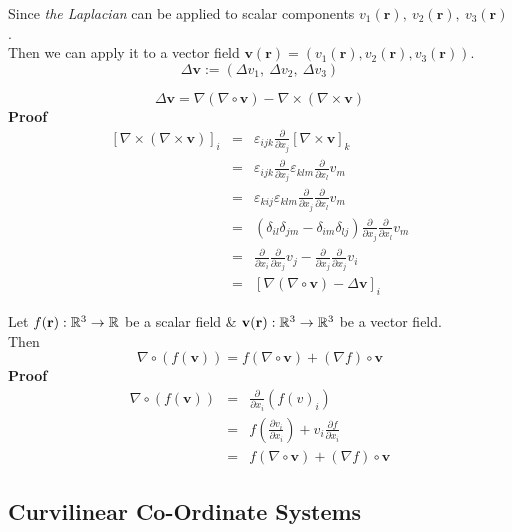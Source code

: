 \documentclass[11pt,a4paper]{article}
\begin{document}
Since \textit{the Laplacian} can be applied to scalar components $v_1(\textbf{r}),\ v_2(\textbf{r}),\ v_3(\textbf{r})$.\\
Then we can apply it to a vector field $\textbf{v}(\textbf{r})=\left(v_1(\textbf{r}), v_2(\textbf{r}), v_3(\textbf{r})\right)$.
$$\Delta\textbf{v}:=(\Delta v_1,\ \Delta v_2,\ \Delta v_3)$$

$$\Delta\textbf{v}=\nabla(\nabla\circ\textbf{v})-\nabla\times(\nabla\times\textbf{v})$$
\textbf{Proof}
\[\begin{array}{rcl}
[\nabla\times(\nabla\times\textbf{v})]_i&=&\varepsilon_{ijk}\frac{\partial}{\partial x_j}[\nabla\times\textbf{v}]_k\\
&=&\varepsilon_{ijk}\frac{\partial}{\partial x_j}\varepsilon_{klm}\frac{\partial}{\partial x_l}v_m\\
&=&\varepsilon_{kij}\varepsilon_{klm}\frac{\partial}{\partial x_j}\frac{\partial}{\partial x_l}v_m\\
&=&(\delta_{il}\delta_{jm}-\delta_{im}\delta_{lj})\frac{\partial}{\partial x_j}\frac{\partial}{\partial x_l}v_m\\
&=&\frac{\partial}{\partial x_i}\frac{\partial}{\partial x_j}v_j-\frac{\partial}{\partial x_j}\frac{\partial}{\partial x_j}v_i\\
&=&[\nabla(\nabla\circ\textbf{v})-\Delta\textbf{v}]_i
\end{array}\]

Let $f(\textbf{r}) : \mathbb{R}^3\to\mathbb{R}$ be a scalar field \& $\textbf{v}(\textbf{r}):\mathbb{R}^3\to\mathbb{R}^3$ be a vector field.\\
Then
$$\nabla\circ(f(\textbf{v}))=f(\nabla\circ\textbf{v})+(\nabla f)\circ\textbf{v}$$
\textbf{Proof}
\[\begin{array}{rcl}
\nabla\circ(f(\textbf{v}))&=&\frac{\partial}{\partial x_i}(f(v)_i)\\
&=&f(\frac{\partial v_i}{\partial x_i})+v_i\frac{\partial f}{\partial x_i}\\
&=&f(\nabla\circ\textbf{v})+(\nabla f)\circ\textbf{v}
\end{array}\]

\subsection{Curvilinear Co-Ordinate Systems}

\end{document}
